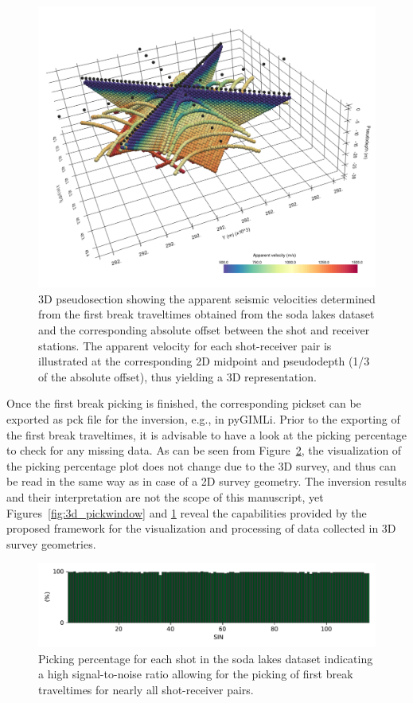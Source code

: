 \documentclass[a4paper,fleqn]{cas-sc}
\begin{document}
\begin{figure}
	\centering
	\includegraphics[width=.75\textwidth]{figures/3d_pseudosection.pdf}
	\caption{3D pseudosection showing the apparent seismic velocities determined from the first break traveltimes obtained from the soda lakes dataset and the corresponding absolute offset between the shot and receiver stations. The apparent velocity for each shot-receiver pair is illustrated at the corresponding 2D midpoint and pseudodepth (1/3 of the absolute offset), thus yielding a 3D representation.}
	\label{fig:3d_pseudosection}
\end{figure}

Once the first break picking is finished, the corresponding pickset can be exported as pck file for the inversion, e.g., in pyGIMLi. Prior to the exporting of the first break traveltimes, it is advisable to have a look at the picking percentage to check for any missing data. As can be seen from Figure~\ref{fig:3d_pickperc}, the visualization of the picking percentage plot does not change due to the 3D survey, and thus can be read in the same way as in case of a 2D survey geometry. The inversion results and their interpretation are not the scope of this manuscript, yet Figures~\ref{fig:3d_pickwindow} and \ref{fig:3d_pseudosection} reveal the capabilities provided by the proposed framework for the visualization and processing of data collected in 3D survey geometries.

\begin{figure}
	\centering
	\includegraphics[width=.75\textwidth]{figures/3d_pickperc.pdf}
	\caption{Picking percentage for each shot in the soda lakes dataset indicating a high signal-to-noise ratio allowing for the picking of first break traveltimes for nearly all shot-receiver pairs.}
	\label{fig:3d_pickperc}
\end{figure}
\end{document}

